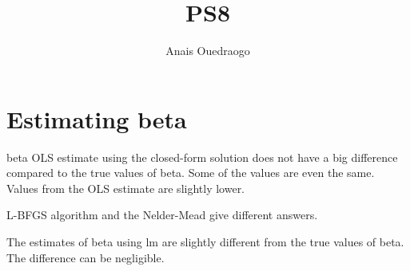 \documentclass{article}
\title{PS8}
\author{Anais Ouedraogo}
\begin{document}
\maketitle


\section{Estimating beta}
beta OLS estimate using the closed-form solution does not have a big difference compared to the true values of beta. Some of the values are even the same. Values from the OLS estimate are slightly lower.

L-BFGS algorithm and the Nelder-Mead give different answers.

The estimates of beta using lm are slightly different from the true values of beta. The difference can be negligible.
\end{document}
